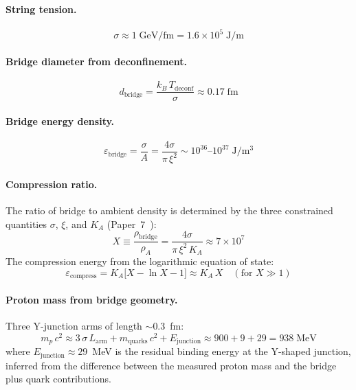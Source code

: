 ﻿\documentclass[12pt,letterpaper]{article}
\newcommand{\rhoa}{\rho_{\!A}}
\newcommand{\Ka}{K_{\!A}}
\begin{document}
\paragraph{String tension.}
%
\begin{equation}
  \sigma \approx 1\;\mathrm{GeV/fm} = 1.6 \times 10^5\;\mathrm{J/m}
  \label{eq:sum-string-tension}
\end{equation}

\paragraph{Bridge diameter from deconfinement.}
%
\begin{equation}
  d_{\mathrm{bridge}} = \frac{k_B\,T_{\mathrm{deconf}}}{\sigma}
    \approx 0.17\;\mathrm{fm}
  \label{eq:sum-bridge-diameter}
\end{equation}

\paragraph{Bridge energy density.}
%
\begin{equation}
  \varepsilon_{\mathrm{bridge}} = \frac{\sigma}{A}
    = \frac{4\sigma}{\pi\,\xi^2}
    \sim 10^{36}\text{--}10^{37}\;\mathrm{J/m^3}
  \label{eq:sum-bridge-eps}
\end{equation}

\paragraph{Compression ratio.}
The ratio of bridge to ambient density is determined by the three
constrained quantities $\sigma$, $\xi$, and $\Ka$
(Paper~7~\cite{otto-quantum}):
%
\begin{equation}
  X \equiv \frac{\rho_{\mathrm{bridge}}}{\rhoa}
    = \frac{4\sigma}{\pi\,\xi^2\,\Ka}
    \approx 7 \times 10^7
  \label{eq:sum-compression}
\end{equation}
%
The compression energy from the logarithmic equation of state:
%
\begin{equation}
  \varepsilon_{\mathrm{compress}} = \Ka\bigl[X - \ln X - 1\bigr]
    \approx \Ka\,X \quad (\text{for } X \gg 1)
  \label{eq:sum-compress-energy}
\end{equation}

\paragraph{Proton mass from bridge geometry.}
Three Y-junction arms of length $\sim$0.3~fm:
%
\begin{equation}
  m_p\,c^2 \approx 3\,\sigma\,L_{\mathrm{arm}} + m_{\mathrm{quarks}}\,c^2
    + E_{\mathrm{junction}}
    \approx 900 + 9 + 29 = 938\;\mathrm{MeV}
  \label{eq:sum-proton}
\end{equation}
%
where $E_{\mathrm{junction}} \approx 29$~MeV is the residual binding
energy at the Y-shaped junction, inferred from the difference between the
measured proton mass and the bridge plus quark contributions.
\end{document}
